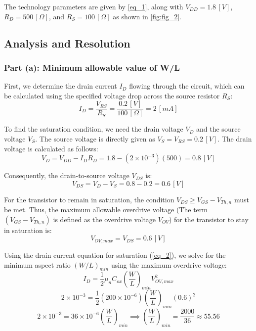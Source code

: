 \documentclass[12pt,a4paper]{article}
\begin{document}
The technology parameters are given by \autoref{eq_1}, along with $V_{DD} = 1.8 \, [V]$, $R_{D} = 500 \, [\Omega]$, and $R_{S} = 100 \, [\Omega]$ as shown in \autoref{fig:fig_2}.


\subsection{Analysis and Resolution}                                \label{sec_3.2}
\subsubsection{Part (a): Minimum allowable value of W/L}            \label{sec_3.2.1}
First, we determine the drain current $I_{D}$ flowing through the circuit, which can be calculated using the specified voltage drop across the source resistor $R_{S}$:
\begin{equation}
    I_{D} = \frac{V_{RS}}{R_{S}} = \frac{0.2 \, [V]}{100 \, [\Omega]} = 2 \, [mA]
    \label{eq_10}
\end{equation}

To find the saturation condition, we need the drain voltage $V_{D}$ and the source voltage $V_{S}$. The source voltage is directly given as $V_{S} = V_{RS} = 0.2 \, [V]$. The drain voltage is calculated as follows:
\begin{equation}
    V_{D} = V_{DD} - I_{D} R_{D} = 1.8 - (2 \times 10^{-3})(500) = 0.8 \, [V]
    \label{eq_11}
\end{equation}

Consequently, the drain-to-source voltage $V_{DS}$ is:
\begin{equation}
    V_{DS} = V_{D} - V_{S} = 0.8 - 0.2 = 0.6 \, [V]
    \label{eq_12}
\end{equation}

For the transistor to remain in saturation, the condition $V_{DS} \ge V_{GS} - V_{Th,n}$ must be met. Thus, the maximum allowable overdrive voltage (The term $(V_{GS} - V_{Th,n})$ is defined as the overdrive voltage $V_{OV}$) for the transistor to stay in saturation is:
\begin{equation}
    V_{OV,max} = V_{DS} = 0.6 \, [V]
    \label{eq_13}
\end{equation}

Using the drain current equation for saturation (\autoref{eq_2}), we solve for the minimum aspect ratio $(W/L)_{min}$ using the maximum overdrive voltage:
\begin{equation}
    I_{D} = \frac{1}{2} \mu_{n} C_{ox} \left(\frac{W}{L}\right)_{min} V_{OV,max}^{2}
    \label{eq_14}
\end{equation}
\begin{equation}
    2 \times 10^{-3} = \frac{1}{2} (200 \times 10^{-6}) \left(\frac{W}{L}\right)_{min} (0.6)^{2}
    \label{eq_15}
\end{equation}
\begin{equation}
    2 \times 10^{-3} = 36 \times 10^{-6} \left(\frac{W}{L}\right)_{min} \implies \left(\frac{W}{L}\right)_{min} = \frac{2000}{36} \approx 55.56
    \label{eq_16}
\end{equation}
\end{document}
